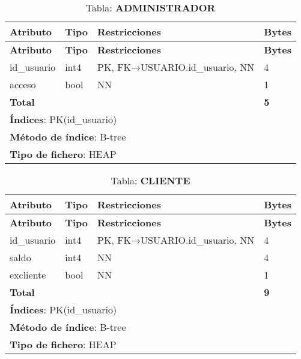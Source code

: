 \begin{longtable}{|l|l|p{5cm}|p{5cm}|}
\caption{Tabla: \textbf{ADMINISTRADOR}}\label{pf_administrador}\\ \hline
\textbf{Atributo} & \textbf{Tipo} & \textbf{Restricciones} & \textbf{Bytes}\\ \hline
\endfirsthead
\hline \textbf{Atributo} & \textbf{Tipo} & \textbf{Restricciones} & \textbf{Bytes}\\ \hline
\endhead
id\_usuario & int4 & PK, FK→USUARIO.id\_usuario, NN & 4 \\ \hline
acceso      & bool & NN                              & 1 \\ \hline
\textbf{Total} &    &                                & \textbf{5}\\ \hline
\multicolumn{4}{|l|}{\textbf{Índices}: PK(id\_usuario)} \\ \hline
\multicolumn{4}{|l|}{\textbf{Método de índice}: B-tree}\\ \hline
\multicolumn{4}{|l|}{\textbf{Tipo de fichero}: HEAP}\\ \hline
\end{longtable}

\newpage
\begin{longtable}{|l|l|p{5cm}|p{5cm}|}
\caption{Tabla: \textbf{CLIENTE}}\label{pf_cliente}\\ \hline
\textbf{Atributo} & \textbf{Tipo} & \textbf{Restricciones} & \textbf{Bytes}\\ \hline
\endfirsthead
\hline \textbf{Atributo} & \textbf{Tipo} & \textbf{Restricciones} & \textbf{Bytes}\\ \hline
\endhead
id\_usuario & int4 & PK, FK→USUARIO.id\_usuario, NN & 4 \\ \hline
saldo       & int4 & NN                             & 4 \\ \hline
excliente   & bool & NN                             & 1 \\ \hline
\textbf{Total} &    &                               & \textbf{9}\\ \hline
\multicolumn{4}{|l|}{\textbf{Índices}: PK(id\_usuario)} \\ \hline
\multicolumn{4}{|l|}{\textbf{Método de índice}: B-tree}\\ \hline
\multicolumn{4}{|l|}{\textbf{Tipo de fichero}: HEAP}\\ \hline
\end{longtable}

